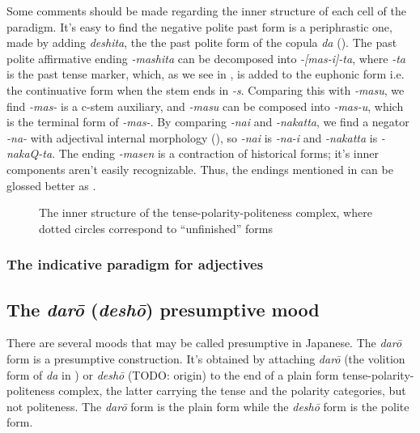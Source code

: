 \documentclass[UTF8, a4paper, oneside, scheme=plain]{ctexrep}
\newcommand{\corpus}[1]{\emph{#1}}
\begin{document}
Some comments should be made regarding the inner structure of each cell of the paradigm.
It's easy to find the negative polite past form is a periphrastic one,
made by adding \corpus{deshita}, the the past polite form of the copula \corpus{da} 
().
The past polite affirmative ending \corpus{-mashita} can be decomposed into 
\corpus{-[mas-i]-ta},
where \corpus{-ta} is the past tense marker,
which, as we see in ,
is added to the euphonic form i.e. the continuative form when the stem ends in \corpus{-s}.
Comparing this with \corpus{-masu},
we find \corpus{-mas-} is a c-stem auxiliary,
and \corpus{-masu} can be composed into \corpus{-mas-u},
which is the terminal form of \corpus{-mas-}.
By comparing \corpus{-nai} and \corpus{-nakatta},
we find a negator \corpus{-na-} with adjectival internal morphology (),
so \corpus{-nai} is \corpus{-na-i} and \corpus{-nakatta} is \corpus{-nakaQ-ta}.
The ending \corpus{-masen} is a contraction of historical forms;
it's inner components aren't easily recognizable.
Thus, the endings mentioned in  can be glossed better as 
.

\begin{figure}[H]
    \centering
    
    \caption{The inner structure of the tense-polarity-politeness complex,
    where dotted circles correspond to ``unfinished'' forms}
    \label{fig:analyzing-tpp-complex}
\end{figure}

\subsubsection{The indicative paradigm for adjectives}



\subsection{The \corpus{dar\={o}} (\corpus{desh\={o}}) presumptive mood}\label{sec:daro-form}

There are several moods that may be called presumptive in Japanese.
The \corpus{dar\={o}} form is a presumptive construction.
It's obtained by attaching \corpus{dar\={o}} 
(the volition form of \corpus{da} in )
or \corpus{desh\={o}} (TODO: origin) to the end of a plain form tense-polarity-politeness complex,
the latter carrying the tense and the polarity categories, 
but not politeness.
The \corpus{dar\={o}} form is the plain form 
while the \corpus{desh\={o}} form is the polite form.
\end{document}
